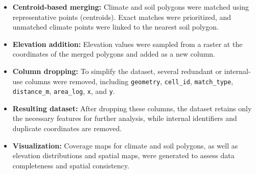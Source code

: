 \begin{itemize}
    \item \textbf{Centroid-based merging:} Climate and soil polygons were matched using representative points (centroids). Exact matches were prioritized, and unmatched climate points were linked to the nearest soil polygon.
    \item \textbf{Elevation addition:} Elevation values were sampled from a raster at the coordinates of the merged polygons and added as a new column.
    \item \textbf{Column dropping:} To simplify the dataset, several redundant or internal-use columns were removed, including \texttt{geometry}, \texttt{cell\_id}, \texttt{match\_type}, \texttt{distance\_m}, \texttt{area\_log}, \texttt{x}, and \texttt{y}.
    \item \textbf{Resulting dataset:} After dropping these columns, the dataset retains only the necessary features for further analysis, while internal identifiers and duplicate coordinates are removed.
    \item \textbf{Visualization:} Coverage maps for climate and soil polygons, as well as elevation distributions and spatial maps, were generated to assess data completeness and spatial consistency.
\end{itemize}

